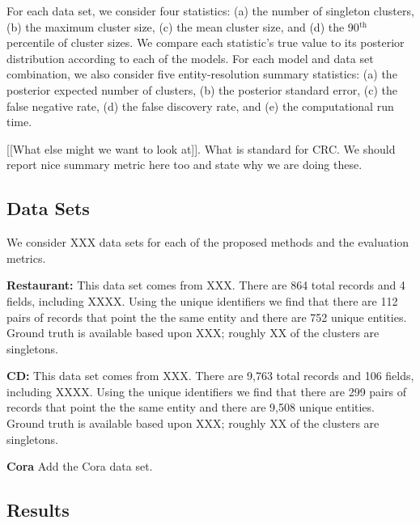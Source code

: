 \documentclass[twoside]{article}
\begin{document}
For each data
set, we consider four statistics: (a) the number of singleton
clusters, (b) the maximum cluster size, (c) the mean cluster size, and
(d) the 90$^{\textrm{th}}$ percentile of cluster sizes. We compare
each statistic's true value to its posterior distribution according to
each of the models. For each model and data set combination, we also
consider five entity-resolution summary statistics: (a) the posterior
expected number of clusters, (b) the posterior standard error, (c) the
false negative rate, (d) the false discovery rate, and (e) the computational run time. 

[[What else might we want to look at]]. What is standard for CRC. We should report nice summary metric here too
and state why we are doing these. 
  

\subsection{Data Sets}
\label{sec:data}

We consider XXX data sets for each of the proposed methods and the evaluation metrics. 

\textbf{Restaurant:} This data set comes from XXX. There are 864 total records
and 4 fields, including XXXX. Using the unique identifiers we find that there are 
112 pairs of records that point the the same entity and there are 752 unique entities. 
Ground truth is available based upon XXX; roughly XX of the clusters are singletons. 

\textbf{CD:} This data set comes from XXX. There are 9,763 total records
and  106 fields, including XXXX. Using the unique identifiers we find that there are 
299 pairs of records that point the the same entity and there are 9,508  unique entities. 
Ground truth is available based upon XXX; roughly XX of the clusters are singletons. 


\textbf{Cora}
Add the Cora data set. 

\subsection{Results}
\label{sec:results}
\end{document}
